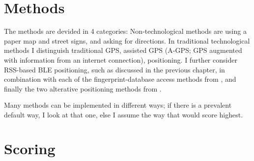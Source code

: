 \section{Methods}
The methods are devided in 4 categories: Non-technological methods are using a paper map and street signs, and asking for directions.
In traditional technological methods I distinguish traditional GPS, assisted GPS (A-GPS; GPS augmented with information from an internet connection), \wifi positioning.
I further consider RSS-based BLE positioning, such as discussed in the previous chapter, in combination with each of the fingerprint-database access methods from , and finally the two alterative positioning methods from .

Many methods can be implemented in different ways; if there is a prevalent default way, I look at that one, else I assume the way that would score highest.
\section{Scoring}

